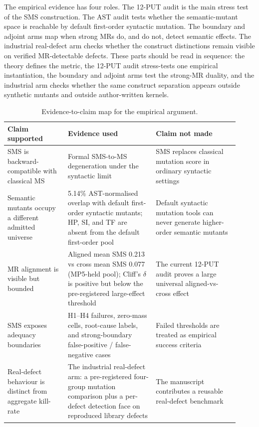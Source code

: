 \documentclass[manuscript,screen,review]{acmart}
\begin{document}
The empirical evidence has four roles. The 12-PUT audit is the main
stress test of the SMS construction. The AST audit tests whether the
semantic-mutant space is reachable by default first-order syntactic
mutation. The boundary and adjoint arms map when strong MRs do, and do
not, detect semantic effects. The industrial real-defect arm checks whether
the construct distinctions remain visible on verified MR-detectable defects.
These parts should be read in sequence: the theory defines the metric,
the 12-PUT audit stress-tests one empirical instantiation, the boundary
and adjoint arms test the strong-MR duality, and the industrial arm
checks whether the same construct separation appears outside synthetic
mutants and outside author-written kernels.

\begin{table}[t]
\caption{Evidence-to-claim map for the empirical argument.}
\label{tab:claim-evidence-map}
\centering
\small
\begin{tabular}{p{0.24\linewidth}p{0.35\linewidth}p{0.33\linewidth}}
\toprule
Claim supported & Evidence used & Claim not made \\
\midrule
SMS is backward-compatible with classical MS & Formal SMS-to-MS
degeneration under the syntactic limit & SMS replaces classical mutation
score in ordinary syntactic settings \\
Semantic mutants occupy a different admitted universe & 5.14\%
AST-normalised overlap with default first-order syntactic mutants;
HP, SI, and TF are absent from the default first-order pool & Default
syntactic mutation tools can never generate higher-order semantic
mutants \\
MR alignment is visible but bounded & Aligned mean SMS 0.213 vs
cross mean SMS 0.077 (MP5-held pool); Cliff's \(\delta\) is positive but below the
pre-registered large-effect threshold & The current 12-PUT audit proves
a large universal aligned-vs-cross effect \\
SMS exposes adequacy boundaries & H1--H4 failures, zero-mass cells,
root-cause labels, and strong-boundary false-positive / false-negative
cases & Failed thresholds are treated as empirical success criteria \\
Real-defect behaviour is distinct from aggregate kill-rate & The
industrial real-defect arm: a pre-registered four-group mutation
comparison plus a per-defect detection face on reproduced library
defects & The manuscript contributes a reusable
real-defect benchmark \\
\bottomrule
\end{tabular}
\normalsize
\end{table}
\end{document}
